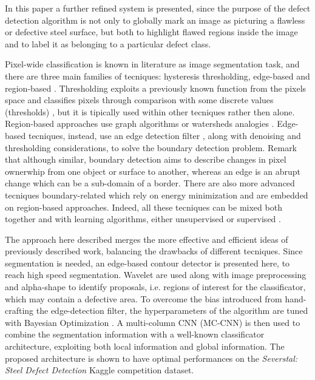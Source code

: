     \par{
        In this paper a further refined system is presented, since the purpose of the defect detection algorithm is not only to globally mark an image as picturing a flawless or defective steel surface, but both to highlight flawed regions inside the image and to label it as belonging to a particular defect class.
    }
    \par{
        Pixel-wide classification is known in literature as image segmentation task, and there are three main families of tecniques: hysteresis thresholding, edge-based and region-based \cite{ieee:7684170}. Thresholding exploits a previously known function from the pixels space and classifies pixels through comparison with some discrete values (thresholds) \cite{ieee:4310039}, but it is tipically used within other tecniques rather then alone. Region-based approaches use graph algorithms \cite{ieee:6205760, ieee:868688} or watersheds analogies \cite{ieee:87344}. Edge-based tecniques, instead, use an edge detection filter \cite{Klette:2014:CCV:2584519, googlescholar:kovesiphase, researchgate:phase}, along with denoising and thresholding considerations, to solve the boundary detection problem. Remark that although similar, boundary detection aims to describe changes in pixel ownerwhip from one object or surface to another, whereas an edge is an abrupt change which can be a sub-domain of a border. There are also more advanced tecniques \cite{springer:Kass1988} boundary-related which rely on energy minimization and are embedded on region-based approaches. Indeed, all these tecniques can be mixed both together and with learning algorithms, either unsupervised \cite{ieee:7684170} or supervised \cite{ieee:1273918}.
    }
    \par{
        The approach here described merges the more effective and efficient ideas of previously described work, balancing the drawbacks of different tecniques. Since segmentation is needed, an edge-based contour detector is presented here, to reach high speed segmentation. Wavelet are used along with image preprocessing and alpha-shape \cite{springer:10.1007/11907350_46} to identify proposals, i.e. regions of interest for the classificator, which may contain a defective area. To overcome the bias introduced from hand-crafting the edge-detection filter, the hyperparameters of the algorithm are tuned with Bayesian Optimization \cite{arXiv:2018arXiv180702811F, arXiv:2012arXiv1206.2944S, rasmussen:williams:2006}.
        A multi-column CNN (MC-CNN) \cite{ieee:6248110} is then used to combine the segmentation information with a well-known classificator architecture, exploiting both local information and global information. The proposed architecture is shown to have optimal performances on the \emph{Severstal: Steel Defect Detection} Kaggle competition dataset.
    }